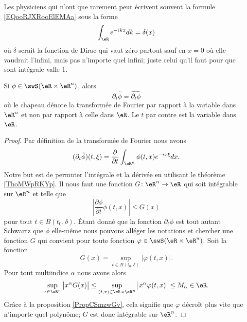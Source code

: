 \begin{normaltext}
    Les physiciens qui n'ont que rarement peur écrivent souvent la formule \eqref{EQooRJXRooElEMAa} sous la forme
    \begin{equation}
        \int_{\eR} e^{-ikx}dk=\delta(x)
    \end{equation}
    où \( \delta\) serait la fonction de Dirac qui vaut zéro partout sauf en \( x=0\) où elle vaudrait l'infini, mais pas n'importe quel infini; juste celui qu'il faut pour que sont intégrale valle \( 1\).
\end{normaltext}

\begin{lemma}   \label{LemYYjFZSa}
    Si \( \phi\in\swS(\eR\times \eR^n)\), alors
    \begin{equation}
        \partial_t\hat\phi=\widehat{\partial_t\phi}
    \end{equation}
    où le chapeau dénote la transformée de Fourier par rapport à la variable dans \( \eR^n\) et non par rapport à celle dans \( \eR\). Le \( t\) par contre est la variable dans \( \eR\).
\end{lemma}

\begin{proof}
    Par définition de la transformée de Fourier nous avons
    \begin{equation}
        (\partial_t\hat\phi)(t,\xi)=\frac{ \partial  }{ \partial t }\int_{\eR^n}\phi(t,x) e^{-i x\xi}dx.
    \end{equation}
    Notre but est de permuter l'intégrale et la dérivée en utilisant le théorème \ref{ThoMWpRKYp}. Il nous faut une fonction \( G\colon \eR^n\to \eR\) qui soit intégrable sur \( \eR^n\) et telle que
    \begin{equation}
        \left| \frac{ \partial \phi }{ \partial t }\phi(t,x) \right| \leq G(x)
    \end{equation}
    pour tout \( t\in B(t_0,\delta)\). Étant donné que la fonction \( \partial_t\phi\) est tout autant Schwartz que \( \phi\) elle-même nous pouvons alléger les notations et chercher une fonction \( G\) qui convient pour toute fonction \( \varphi\in\swS(\eR\times \eR^n)\). Soit la fonction
    \begin{equation}
        G(x)=\sup_{t\in B(t_0,\delta)}| \varphi(t,x) |.
    \end{equation}
    Pour tout multiindice \( \alpha\) nous avons alors
    \begin{equation}
        \sup_{x\in \eR^n}\big| x^{\alpha}G(x) \big|\leq \sup_{(t,x)\in \eR\times \eR^n}\big| x^{\alpha}\varphi(t,x) \big|\leq M_{\alpha}\in \eR.
    \end{equation}
    Grâce à la proposition \ref{PropCSmzwGv}, cela signifie que \( \varphi\) décroît plus vite que n'importe quel polynôme; \( G\) est donc intégrable sur \( \eR^n\).
\end{proof}

